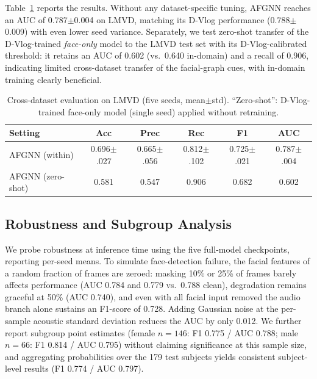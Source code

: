 \documentclass[conference]{IEEEtran}
\begin{document}
Table~\ref{tab:lmvd} reports the results. Without any dataset-specific tuning, AFGNN reaches an AUC of 0.787$\pm$0.004 on LMVD, matching its D-Vlog performance (0.788$\pm$0.009) with even lower seed variance. Separately, we test zero-shot transfer of the D-Vlog-trained \emph{face-only} model to the LMVD test set with its D-Vlog-calibrated threshold: it retains an AUC of 0.602 (vs.\ 0.640 in-domain) and a recall of 0.906, indicating limited cross-dataset transfer of the facial-graph cues, with in-domain training clearly beneficial.

\begin{table}[!t]
\centering
\caption{Cross-dataset evaluation on LMVD (five seeds, mean$\pm$std). ``Zero-shot'': D-Vlog-trained face-only model (single seed) applied without retraining.}
\label{tab:lmvd}
\scriptsize
\setlength{\tabcolsep}{1.2pt}
\begin{tabular}{lccccc}
\toprule[1.2pt]
Setting & Acc & Prec & Rec & F1 & AUC \\
\midrule[0.8pt]
AFGNN (within) & 0.696{\scriptsize$\pm$.027} & 0.665{\scriptsize$\pm$.056} & 0.812{\scriptsize$\pm$.102} & 0.725{\scriptsize$\pm$.021} & 0.787{\scriptsize$\pm$.004} \\
AFGNN (zero-shot) & 0.581 & 0.547 & 0.906 & 0.682 & 0.602 \\
\bottomrule[1.2pt]
\end{tabular}
\end{table}

\subsection{Robustness and Subgroup Analysis}

We probe robustness at inference time using the five full-model checkpoints, reporting per-seed means. To simulate face-detection failure, the facial features of a random fraction of frames are zeroed: masking 10\% or 25\% of frames barely affects performance (AUC 0.784 and 0.779 vs.\ 0.788 clean), degradation remains graceful at 50\% (AUC 0.740), and even with all facial input removed the audio branch alone sustains an F1-score of 0.728. Adding Gaussian noise at the per-sample acoustic standard deviation reduces the AUC by only 0.012. We further report subgroup point estimates (female $n=146$: F1 0.775 / AUC 0.788; male $n=66$: F1 0.814 / AUC 0.795) without claiming significance at this sample size, and aggregating probabilities over the 179 test subjects yields consistent subject-level results (F1 0.774 / AUC 0.797).
\end{document}
